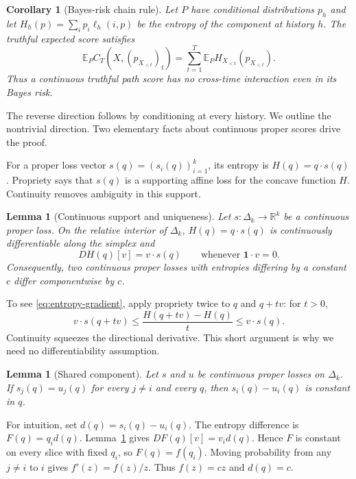 \documentclass[twoside]{article}
\newtheorem{corollary}[theorem]{Corollary}
\newtheorem{lemma}[theorem]{Lemma}
\newcommand{\E}{\mathbb E}
\newcommand{\1}{\mathbf 1}
\begin{document}
\begin{corollary}[Bayes-risk chain rule]
\label{cor:chain}
Let $P$ have conditional distributions $p_h$ and let $H_h(p)=\sum_i p_i\ell_h(i,p)$ be the entropy of the component at history $h$. The truthful expected score satisfies
\begin{equation}
 \E_P C_T(X,(p_{X_{<t}})_t)
 =\sum_{t=1}^T\E_P H_{X_{<t}}(p_{X_{<t}}).
 \label{eq:chain}
\end{equation}
Thus a continuous truthful path score has no cross-time interaction even in its Bayes risk.
\end{corollary}

The reverse direction follows by conditioning at every history. We outline the nontrivial direction. Two elementary facts about continuous proper scores drive the proof.

For a proper loss vector $s(q)=(s_i(q))_{i=1}^k$, its entropy is $H(q)=q\cdot s(q)$. Propriety says that $s(q)$ is a supporting affine loss for the concave function $H$. Continuity removes ambiguity in this support.

\begin{lemma}[Continuous support and uniqueness]
\label{lem:unique}
Let $s:\Delta_k\to\mathbb R^k$ be a continuous proper loss. On the relative interior of $\Delta_k$, $H(q)=q\cdot s(q)$ is continuously differentiable along the simplex and
\begin{equation}
 D H(q)[v]=v\cdot s(q)\qquad\text{whenever }\1\cdot v=0.
 \label{eq:entropy-gradient}
\end{equation}
Consequently, two continuous proper losses with entropies differing by a constant $c$ differ componentwise by $c$.
\end{lemma}

To see \eqref{eq:entropy-gradient}, apply propriety twice to $q$ and $q+tv$: for $t>0$,
\begin{equation*}
 v\cdot s(q+tv)\leq
 \frac{H(q+tv)-H(q)}{t}\leq v\cdot s(q).
\end{equation*}
Continuity squeezes the directional derivative. This short argument is why we need no differentiability assumption.

\begin{lemma}[Shared component]
\label{lem:shared}
Let $s$ and $u$ be continuous proper losses on $\Delta_k$. If $s_j(q)=u_j(q)$ for every $j\ne i$ and every $q$, then $s_i(q)-u_i(q)$ is constant in $q$.
\end{lemma}

For intuition, set $d(q)=s_i(q)-u_i(q)$. The entropy difference is $F(q)=q_i d(q)$. Lemma~\ref{lem:unique} gives $DF(q)[v]=v_i d(q)$. Hence $F$ is constant on every slice with fixed $q_i$, so $F(q)=f(q_i)$. Moving probability from any $j\ne i$ to $i$ gives $f'(z)=f(z)/z$. Thus $f(z)=cz$ and $d(q)=c$.
\end{document}
